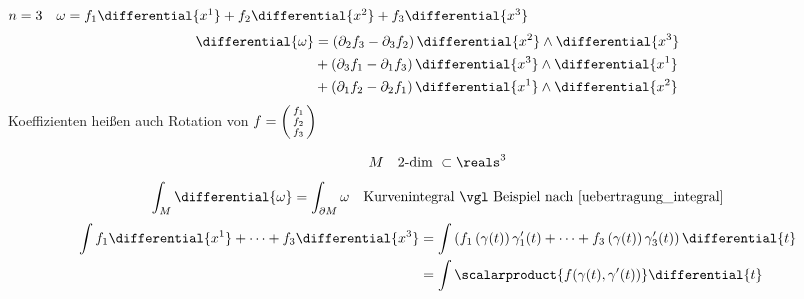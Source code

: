 \begin{beispiel*}
  \( n=3\quad \omega=f_1\differential{x^1}+f_2\differential{x^2}+f_3\differential{x^3} \)
  \begin{align*}
      \differential{\omega}&= \left( \partial_2f_3-\partial_3f_2 \right)\differential{x^2}\wedge \differential{x^3}\\
      &+\left( \partial_3f_1-\partial_1f_3 \right) \differential{x^3}\wedge \differential{x^1}\\
      &+\left( \partial_1f_2-\partial_2f_1 \right)\differential{x^1}\wedge \differential{x^2}
  \end{align*}
  Koeffizienten heißen auch Rotation von \( f=\begin{psmallmatrix} f_1\\f_2\\f_3 \end{psmallmatrix} \)

  \begin{equation*}
      M\quad \text{2-dim }\subset \reals^3
  \end{equation*}
  \begin{equation*}
      \int_M\differential{\omega}=\int_{\partial M}\omega\quad \text{Kurvenintegral \vgl Beispiel nach \ref{uebertragung_integral}}
  \end{equation*}
  \begin{align*}
      \int f_1\differential{x^1}+\dotsb +f_3\differential{x^3} &= \int\left( f_1\left( \gamma(t) \right)\gamma_1'(t)+\dotsb +f_3\left( \gamma(t) \right)\gamma_3'(t) \right)\differential{t}\\
      &= \int\scalarproduct{f(\gamma(t),\gamma'(t))}\differential{t}
  \end{align*}
\end{beispiel*}


